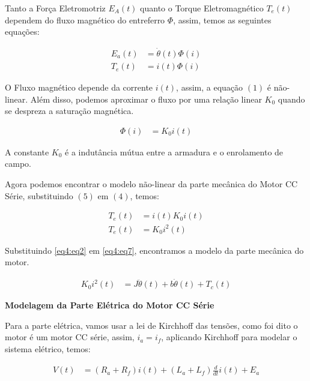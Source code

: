 Tanto a Força Eletromotriz $E_A(t)$ quanto o Torque Eletromagnético $T_e(t)$ dependem do fluxo magnético do entreferro $\Phi$, assim, temos as seguintes equações:

\begin{align}
	E_a(t) &= \dot{\theta}(t) \Phi{(i)} \label{eq4:eq3}\\
	T_e(t) &= i(t) \Phi{(i)}			\label{eq4:eq4}
\end{align}

O Fluxo magnético depende da corrente $i(t)$, assim, a equação $(1)$ é não-linear. Além disso, podemos aproximar o fluxo por uma relação linear $K_0$ quando se despreza a saturação magnética.

\begin{align}
	\Phi(i) &= K_0 i(t) \label{eq4:eq5}
\end{align}

A constante $K_0$ é a indutância mútua entre a armadura e o enrolamento de campo.

Agora podemos encontrar o modelo não-linear da parte mecânica do Motor CC Série, substituindo $(5)$ em $(4)$, temos:

\begin{align}
	T_e(t) &= i(t) K_0 i(t) \label{eq4:eq6}\\
	T_e(t) &= K_0 i^2(t) 	\label{eq4:eq7}
\end{align}

Substituindo \ref{eq4:eq2} em \ref{eq4:eq7}, encontramos a modelo da parte mecânica do motor.


\begin{align}
	K_0 i^2(t) &= J\ddot{\theta}(t) + b\dot{\theta}(t) + T_c(t) \label{eq4:eq8}
\end{align}


\noindent \textbf{Modelagem da Parte Elétrica do Motor CC Série}

Para a parte elétrica, vamos usar a lei de Kirchhoff das tensões, como foi dito o motor é um motor CC série, assim, $i_a = i_f$, aplicando Kirchhoff para modelar o sistema elétrico, temos:


\begin{align}
	V(t) &= (R_a + R_f)i(t)+ (L_a + L_f)\frac{d}{dt}i(t) + E_a \label{eq4:eq9}
\end{align}

